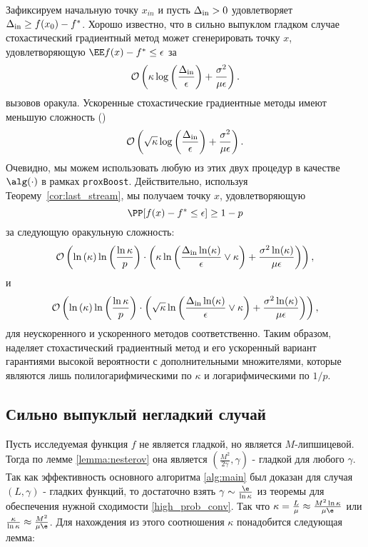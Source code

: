 Зафиксируем начальную точку $x_{in}$ и пусть $\Delta_{\rm in}>0$ удовлетворяет $\Delta_{\rm in}\geq f(x_0)-f^*$.
Хорошо известно, что в сильно выпуклом гладком случае стохастический градиентный метод может сгенерировать точку $x$, удовлетворяющую
$\EE f(x)-f^*\leq \epsilon$ за
\begin{equation}\label{eqn:grad_desn_est}
\mathcal{O}\left(\kappa\log\left(\frac{\Delta_{\rm in}}{\epsilon}\right)+\frac{\sigma^2}{\mu\epsilon}\right).
\end{equation}
вызовов оракула.
Ускоренные стохастические градиентные методы  имеют меньшую сложность (\cite{ghadimi2013optimal})
\begin{equation}\label{eqn:accel_rate}
\mathcal{O}\left(\sqrt{\kappa}\log\left(\frac{\Delta_{\rm in}}{\epsilon}\right)+\frac{\sigma^2}{\mu\epsilon}\right).
\end{equation}
Очевидно, мы можем использовать любую из этих двух процедур в качестве $\alg(\cdot)$ в рамках \texttt{proxBoost}.
Действительно, используя Теорему~\ref{cor:last_stream}, мы получаем точку $x$, удовлетворяющую
$$\PP[f(x)-f^*\leq \epsilon]\geq 1-p$$
за следующую оракульную сложность:
\begin{equation}\label{eqn:rob_rate1}
\mathcal{O}\left(\ln\left(\kappa\right)\ln\left(\frac{\ln\kappa}{p}\right)\cdot \left(\kappa\ln\left(\frac{\Delta_{\rm in}\ln(\kappa)}{\epsilon}\vee \kappa\right)+ \frac{\sigma^2\ln(\kappa)}{\mu\epsilon}\right)\right),
\end{equation}
и
\begin{equation}\label{eqn:rob_rate2}
\mathcal{O}\left(\ln\left(\kappa\right)\ln\left(\frac{\ln\kappa}{p}\right)\cdot \left(\sqrt{\kappa}\ln\left(\frac{\Delta_{\rm in}\ln(\kappa)}{\epsilon}\vee \kappa\right)+ \frac{\sigma^2\ln(\kappa)}{\mu\epsilon}\right)\right),
\end{equation}
для неускоренного и ускоренного методов соответственно. Таким образом, \pboost  наделяет стохастический градиентный метод и его ускоренный вариант гарантиями высокой вероятности с дополнительными множителями, которые являются лишь полилогарифмическими по $\kappa$ и логарифмическими по $1/p$.

\subsection{Сильно выпуклый негладкий случай}
Пусть исследуемая функция $f$ не является гладкой, но является $M$-липшицевой. Тогда по лемме \ref{lemma:nesterov} она является $(\frac{M^2}{2\gamma}, \gamma)$ - гладкой для любого $\gamma$. Так как эффективность основного алгоритма \ref{alg:main} был доказан для случая $(L, \gamma)$ - гладких функций, то достаточно взять $\gamma \sim \frac{\e}{\ln{\kappa}}$ из теоремы для обеспечения нужной сходимости \ref{high_prob_conv}. Так что $\kappa = \frac{L}{\mu} \approx \frac{M^2 \ln{\kappa}}{\mu \e}$ или $\frac{\kappa}{\ln{\kappa}} \approx \frac{M^2}{\mu \e}$. Для нахождения из этого соотношения $\kappa$ понадобится следующая лемма:

